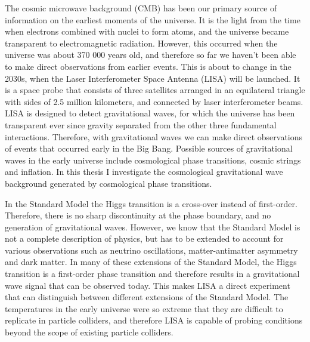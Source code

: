 The cosmic microwave background (CMB) has been our primary source of information on the earliest moments of the universe.
It is the light from the time when electrons combined with nuclei to form atoms,
and the universe became transparent to electromagnetic radiation.
However, this occurred when the universe was about 370 000 years old,
and therefore so far we haven't been able to make direct observations from earlier events.
This is about to change in the 2030s, when the Laser Interferometer Space Antenna (LISA) will be launched.
It is a space probe that consists of three satellites arranged in an equilateral triangle with sides of 2.5 million kilometers,
and connected by laser interferometer beams.
LISA is designed to detect gravitational waves,
for which the universe has been transparent ever since gravity separated from the other three fundamental interactions.
Therefore, with gravitational waves we can make direct observations of events that occurred early in the Big Bang.
Possible sources of gravitational waves in the early universe include cosmological phase transitions, cosmic strings and inflation.
In this thesis I investigate the cosmological gravitational wave background generated by cosmological phase transitions.
\cites{lecture_notes}{lisa_2017}{colpi_lisa_2024}

In the Standard Model the Higgs transition is a cross-over instead of first-order.
Therefore, there is no sharp discontinuity at the phase boundary, and no generation of gravitational waves.
However, we know that the Standard Model is not a complete description of physics,
but has to be extended to account for various observations such as neutrino oscillations, matter-antimatter asymmetry and dark matter.
In many of these extensions of the Standard Model, the Higgs transition is a first-order phase transition
and therefore results in a gravitational wave signal that can be observed today.
This makes LISA a direct experiment that can distinguish between different extensions of the Standard Model.
The temperatures in the early universe were so extreme that they are difficult to replicate in particle colliders,
and therefore LISA is capable of probing conditions beyond the scope of existing particle colliders.
\cites{lecture_notes}{kajantie_is_1996}{caprini_detecting_2020}

